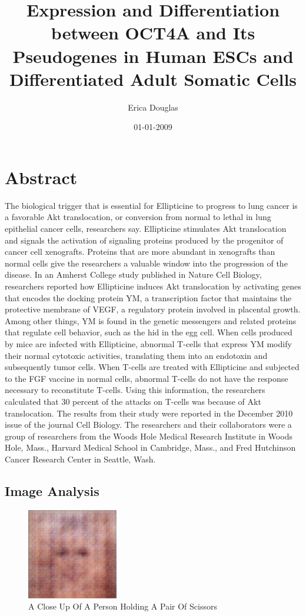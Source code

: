 \documentclass{article}%
\title{Expression and Differentiation between OCT4A and Its Pseudogenes in Human ESCs and Differentiated Adult Somatic Cells}%
\author{Erica Douglas}%
\affil{Advanced Laboratory for Plant Genetic Engineering, Advanced Technology Development Centre, Indian Institute of Technology Kharagpur, Kharagpur, India}%
\date{01{-}01{-}2009}%
\begin{document}
%
\normalsize%
\maketitle%
\section{Abstract}%
\label{sec:Abstract}%
The biological trigger that is essential for Ellipticine to progress to lung cancer is a favorable Akt translocation, or conversion from normal to lethal in lung epithelial cancer cells, researchers say. Ellipticine stimulates Akt translocation and signals the activation of signaling proteins produced by the progenitor of cancer cell xenografts.\newline%
Proteins that are more abundant in xenografts than normal cells give the researchers a valuable window into the progression of the disease.\newline%
In an Amherst College study published in Nature Cell Biology, researchers reported how Ellipticine induces Akt translocation by activating genes that encodes the docking protein YM, a transcription factor that maintains the protective membrane of VEGF, a regulatory protein involved in placental growth. Among other things, YM is found in the genetic messengers and related proteins that regulate cell behavior, such as the hid in the egg cell.\newline%
When cells produced by mice are infected with Ellipticine, abnormal T{-}cells that express YM modify their normal cytotoxic activities, translating them into an endotoxin and subsequently tumor cells. When T{-}cells are treated with Ellipticine and subjected to the FGF vaccine in normal cells, abnormal T{-}cells do not have the response necessary to reconstitute T{-}cells.\newline%
Using this information, the researchers calculated that 30 percent of the attacks on T{-}cells was because of Akt translocation.\newline%
The results from their study were reported in the December 2010 issue of the journal Cell Biology.\newline%
The researchers and their collaborators were a group of researchers from the Woods Hole Medical Research Institute in Woods Hole, Mass., Harvard Medical School in Cambridge, Mass., and Fred Hutchinson Cancer Research Center in Seattle, Wash.

%
\subsection{Image Analysis}%
\label{subsec:ImageAnalysis}%


\begin{figure}[h!]%
\centering%
\includegraphics[width=150px]{500_fake_images/samples_5_223.png}%
\caption{A Close Up Of A Person Holding A Pair Of Scissors}%
\end{figure}

%
\end{document}
